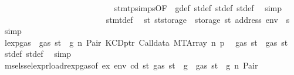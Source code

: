 \begin{isabellebody}
\ \ \ \ \ \ \ \ \ \ \ \ \ \ \ \ \ \ \ \ \ \ \ \ \ \ \isamarkupfalse%
\ stmt{\isachardot}{\kern0pt}psimps{\isacharparenleft}{\kern0pt}{}{\isacharparenright}{\kern0pt}{\isacharbrackleft}{\kern0pt}OF\ {}{\isacharparenleft}{\kern0pt}{}{\isacharparenright}{\kern0pt}{\isacharbrackright}{\kern0pt}\ g{\isacharunderscore}{\kern0pt}def\ st{\isacharprime}{\kern0pt}{\isacharunderscore}{\kern0pt}def\ st{\isacharprime}{\kern0pt}{\isacharprime}{\kern0pt}{\isacharunderscore}{\kern0pt}def\ st{\isacharprime}{\kern0pt}{\isacharprime}{\kern0pt}{\isacharprime}{\kern0pt}{\isacharunderscore}{\kern0pt}def\ \isamarkupfalse%
\ simp\isanewline
\ \ \ \ \ \ \ \ \ \ \ \ \ \ \ \ \ \ \ \ \ \ \ \ \isamarkupfalse%
\ stmt{\isacharunderscore}{\kern0pt}def\ \isamarkupfalse%
\ {\isachardoublequoteopen}st{}{\isacharprime}{\kern0pt}{\isacharequal}{\kern0pt}\ {\isacharparenleft}{\kern0pt}st{\isacharprime}{\kern0pt}{\isacharprime}{\kern0pt}{\isacharprime}{\kern0pt}{\isasymlparr}storage\ {\isacharcolon}{\kern0pt}{\isacharequal}{\kern0pt}\ {\isacharparenleft}{\kern0pt}storage\ st{\isacharprime}{\kern0pt}{\isacharprime}{\kern0pt}{\isacharparenright}{\kern0pt}\ {\isacharparenleft}{\kern0pt}address\ env\ {\isacharcolon}{\kern0pt}{\isacharequal}{\kern0pt}\ s{\isacharparenright}{\kern0pt}{\isasymrparr}{\isacharparenright}{\kern0pt}{\isachardoublequoteclose}\ \isamarkupfalse%
\ simp\isanewline
\ \ \ \ \ \ \ \ \ \ \ \ \ \ \ \ \ \ \ \ \ \ \ \ \isamarkupfalse%
\ \isamarkupfalse%
\ lexp{\isacharunderscore}{\kern0pt}gas\ {\isacharbackquoteopen}{\isasymnot}\ gas\ st\ {\isasymle}\ g{\isacharbackquoteclose}\ n\ Pair\ KCDptr\ Calldata\ MTArray\ n{}\ p{}\ \isamarkupfalse%
\ {\isachardoublequoteopen}gas\ st{\isacharprime}{\kern0pt}{\isacharprime}{\kern0pt}{\isacharprime}{\kern0pt}\ {\isasymle}\ gas\ st{\isacharprime}{\kern0pt}{\isacharprime}{\kern0pt}{\isachardoublequoteclose}\ \isamarkupfalse%
\ st{\isacharprime}{\kern0pt}{\isacharprime}{\kern0pt}{\isacharunderscore}{\kern0pt}def\ st{\isacharprime}{\kern0pt}{\isacharprime}{\kern0pt}{\isacharprime}{\kern0pt}{\isacharunderscore}{\kern0pt}def\ \isamarkupfalse%
\ simp\isanewline
\ \ \ \ \ \ \ \ \ \ \ \ \ \ \ \ \ \ \ \ \ \ \ \ \isamarkupfalse%
\ \isamarkupfalse%
\ msel{\isacharunderscore}{\kern0pt}ssel{\isacharunderscore}{\kern0pt}expr{\isacharunderscore}{\kern0pt}load{\isacharunderscore}{\kern0pt}rexp{\isacharunderscore}{\kern0pt}gas{\isacharparenleft}{\kern0pt}{}{\isacharparenright}{\kern0pt}{\isacharbrackleft}{\kern0pt}of\ ex\ env\ cd\ st{\isacharprime}{\kern0pt}\ {\isachardoublequoteopen}gas\ st\ {\isacharminus}{\kern0pt}\ g{\isachardoublequoteclose}{\isacharbrackright}{\kern0pt}\ {\isacharbackquoteopen}{\isasymnot}\ gas\ st\ {\isasymle}\ g{\isacharbackquoteclose}\ n\ Pair\ \isamarkupfalse%

\end{isabellebody}

